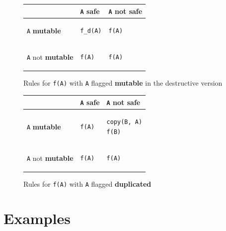 \documentclass[12pt,a4paper,titlepage]{article}
\newcommand{\cl}[1]{\texttt{#1}}
\newcommand{\bang}{ \textbf{ mutable } }
\newcommand{\safe}{ \textbf{ safe } }
\newcommand{\dupl}{ \textbf{ duplicated } }
\begin{document}
\begin{figure}[!ht]
\begin{tabular}{|p{5.5cm}|p{5.5cm}|p{6cm}|}
\hline
             & \cl{A} \safe & \cl{A} not \safe \\ \hline
\cl{A} \bang  &
\begin{lstlisting}
f_d(A)
\end{lstlisting} & \begin{lstlisting}
f(A)
\end{lstlisting} \\ \hline
\cl{A} not \bang & \begin{lstlisting}
f(A)
\end{lstlisting} & \begin{lstlisting}
f(A)
\end{lstlisting} \\ \hline
\end{tabular}
\caption{Rules for \cl{f(A)} with \cl{A} flagged \bang in the destructive version}
\end{figure}


\begin{figure}[!ht]
\begin{tabular}{|p{5.5cm}|p{5.5cm}|p{6cm}|}
\hline
             & \cl{A} \safe & \cl{A} not \safe \\ \hline
\cl{A} \bang  &
\begin{lstlisting}
f(A)
\end{lstlisting} & \begin{lstlisting}
copy(B, A)
f(B)
\end{lstlisting} \\ \hline
\cl{A} not \bang & \begin{lstlisting}
f(A)
\end{lstlisting} & \begin{lstlisting}
f(A)
\end{lstlisting} \\ \hline
\end{tabular}
\caption{Rules for \cl{f(A)} with \cl{A} flagged \dupl}
\end{figure}






\newpage
\section{Examples}
\end{document}
